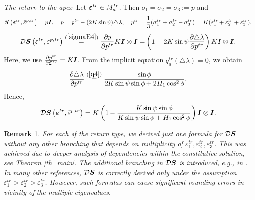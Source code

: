 \documentclass[a4paper,12pt]{article}
\newtheorem{remark}{Remark}[section]
\theoremstyle{remark}
\newcommand{\mbf}[1]{\mbox{\boldmath$#1$}}
\numberwithin{equation}{section}
\begin{document}
\bigskip\noindent
{\it The return to the apex.} Let $\mbf{\varepsilon}^{tr}\in M^{tr}_{a}$. Then $\sigma_1=\sigma_2=\sigma_3:=p$ and
\begin{equation}
\mbf S\left(\mbf{\varepsilon}^{tr},\bar{\varepsilon}^{p,tr}\right)=p\mbf I,\quad p=p^{tr}-(2K\sin\psi)\triangle\lambda,\quad p^{tr}=\frac{1}{3}(\sigma_1^{tr}+\sigma_2^{tr}+\sigma_3^{tr})=K(\varepsilon_1^{tr}+\varepsilon_2^{tr}+\varepsilon_3^{tr}),
\label{sigmaE4}
\end{equation}
\begin{equation*}
\mathcal D\mbf S\left(\mbf{\varepsilon}^{tr},\bar{\varepsilon}^{p,tr}\right)\stackrel{(\ref{sigmaE4})}{=}\frac{\partial p}{\partial p^{tr}}K\mbf I\otimes\mbf I=\left(1-2K\sin\psi\frac{\partial\triangle\lambda}{\partial p^{tr}}\right)K\mbf I\otimes\mbf I.
\end{equation*}
Here, we use $\frac{\partial p^{tr}}{\partial \mbf{\varepsilon}^{tr}}=K\mbf I$. From the implicit equation $q^{tr}_a(\triangle\lambda)=0$, we obtain
\begin{equation*}
\frac{\partial\triangle\lambda}{\partial p^{tr}}\stackrel{(\ref{q4})}{=}\frac{\sin\phi}{2K\sin\psi\sin\phi+2H_1\cos^2\phi}.
\label{dlambda4}
\end{equation*}
Hence,
\begin{equation}
\mathcal D\mbf S\left(\mbf{\varepsilon}^{tr},\bar{\varepsilon}^{p,tr}\right)=K\left(1-\frac{K\sin\psi\sin\phi}{K\sin\psi\sin\phi+H_1\cos^2\phi}\right)\mbf I\otimes\mbf I.
\end{equation}

\begin{remark}
\emph{For each of the return type, we derived just one formula for $\mathcal D\mbf S$ without any other branching that depends on multiplicity of $\varepsilon_1^{tr},\varepsilon_2^{tr},\varepsilon_3^{tr}$. This was achieved due to deeper analysis of dependencies within the constitutive solution, see Theorem \ref{th_main}. The additional branching in $\mathcal D\mbf S$ is introduced, e.g., in \cite[Appendix A]{NPO08}. In many other references, $\mathcal D\mbf S$ is correctly derived only under the assumption $\varepsilon_1^{tr}>\varepsilon_2^{tr}>\varepsilon_3^{tr}$. However, such formulas can cause significant rounding errors in vicinity of the multiple eigenvalues.}
\end{remark}
\end{document}
